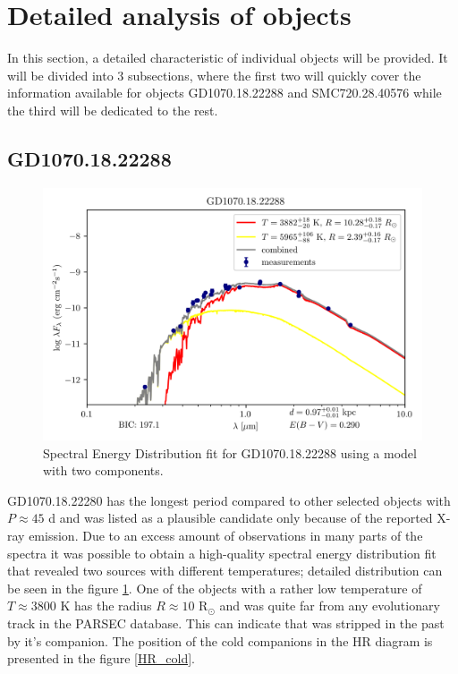 \documentclass{pracalicmgr}
\begin{document}
\section{Detailed analysis of objects}
In this section, a detailed characteristic of individual objects will be provided. It will be divided into $3$ subsections, where the first two will quickly cover the information
available for objects GD1070.18.22288 and SMC720.28.40576 while the third will be dedicated to the rest.
\subsection{GD1070.18.22288}
\begin{figure}[H]
    \includegraphics{plots/GD1070.18.22288/GD1070.18.22288_double_emcee.png}
    \caption{Spectral Energy Distribution fit for GD1070.18.22288 using a model with two components.}\label{GD1070SED}
\end{figure}
GD1070.18.22280 has the longest period compared to other selected objects with $P\approx 45$ d and was listed as a plausible candidate only because of the reported X-ray emission.
Due to an excess amount of observations in many parts of the spectra it was possible to obtain a high-quality spectral energy distribution fit that revealed two sources with different temperatures;
detailed distribution can be seen in the figure \ref{GD1070SED}.
One of the objects with a rather low temperature of
$T\approx 3800$ K has the radius $R\approx 10$ $\textrm{R}_{\odot}$ and was quite far from any evolutionary track in the PARSEC database. This can indicate
that was stripped in the past by it's companion.
The position of the cold companions in the HR diagram is presented in the figure \ref{HR_cold}.
\end{document}
